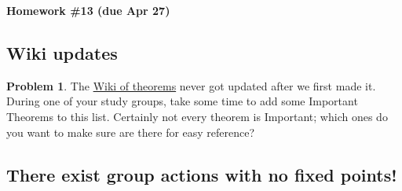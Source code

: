 \documentclass[12pt]{article}
\theoremstyle{definition} %
\newtheorem{problem}{Problem}
\renewcommand{\section}[1]{\begin{center} \textbf{#1} \\\end{center}}
\begin{document}
\section{Homework \#13 (due Apr 27)}

\subsection*{Wiki updates}

\begin{problem}
  The \href{https://westminster.instructure.com/courses/3521461/pages/wiki-of-abstract-algebra-theorems?module_item_id=87072884}{Wiki of theorems} never got updated after we first made it. During one of your study groups, take some time to add some Important Theorems to this list. Certainly not every theorem is Important; which ones do you want to make sure are there for easy reference?
\end{problem}

\subsection*{There exist group actions with no fixed points!}
\end{document}
